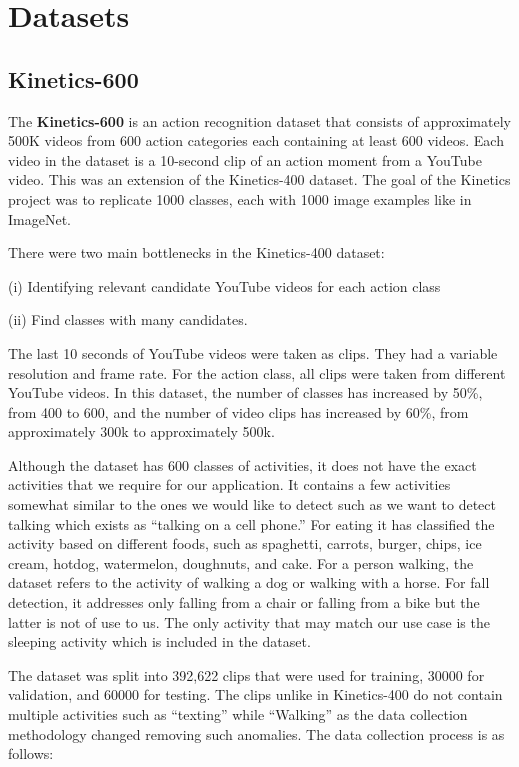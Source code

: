
\chapter{Datasets} %
\label{Chapter3}
\section{Kinetics-600}
The \textbf{Kinetics-600} \cite{kinetics-600} is an action recognition dataset that consists of approximately 500K videos from 600 action categories each containing at least 600 videos. Each video in the dataset is a 10-second clip of an action moment from a YouTube video. This was an extension of the Kinetics-400 \cite{kinetics-400} dataset. The goal of the Kinetics project was to replicate 1000 classes, each with 1000 image examples like in ImageNet.

There were two main bottlenecks in the Kinetics-400 dataset: 

(i) Identifying relevant candidate YouTube videos for each action class

(ii) Find classes with many candidates. 

The last 10 seconds of YouTube videos were taken as clips. They had a variable resolution and frame rate. For the action class, all clips were taken from different YouTube videos. In this dataset, the number of classes has increased by 50\%, from 400 to 600, and the number of video clips has increased by 60\%, from approximately 300k to approximately 500k.

Although the dataset has 600 classes of activities, it does not have the exact activities that we require for our application. It contains a few activities somewhat similar to the ones we would like to detect such as we want to detect talking which exists as “talking on a cell phone.” For eating it has classified the activity based on different foods, such as spaghetti, carrots, burger, chips, ice cream, hotdog, watermelon, doughnuts, and cake. For a person walking, the dataset refers to the activity of walking a dog or walking with a horse. For fall detection, it addresses only falling from a chair or falling from a bike but the latter is not of use to us. The only activity that may match our use case is the sleeping activity which is included in the dataset. 

 The dataset was split into 392,622 clips that were used for training, 30000 for validation, and 60000 for testing. The clips unlike in Kinetics-400 do not contain multiple activities such as “texting” while “Walking” as the data collection methodology changed removing such anomalies. The data collection process is as follows:

